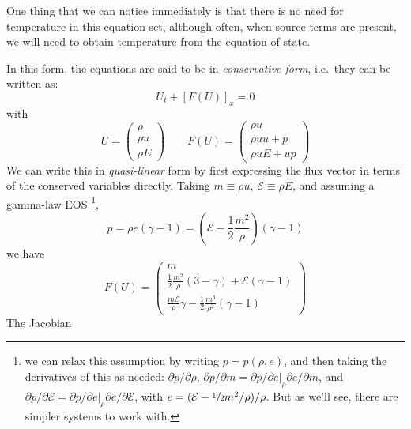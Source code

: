 One thing that we can notice immediately is that there is no need for
temperature in this equation set, although often, when source terms
are present, we will need to obtain temperature from the equation of
state.

In this form, the equations are said to be in {\em conservative form},
i.e.\ they can be written as:
\begin{equation}
U_t + \left [F(U) \right ]_x = 0
\end{equation}
with
\begin{equation}
U = \left ( \begin{array}{c} \rho \\ \rho u \\ \rho E \end{array} \right )
%
\qquad
%
F(U) = \left ( \begin{array}{c} \rho u \\ \rho uu + p \\ \rho u E + up \end{array} \right )
\end{equation}
%
We can write this in {\em quasi-linear} form by first expressing the
flux vector in terms of the conserved variables directly.  Taking $m
\equiv \rho u$, $\mathcal{E} \equiv \rho E$, and assuming a gamma-law
EOS%
\footnote{we can relax this assumption by writing $p = p(\rho, e)$, and then
taking the derivatives of this as needed:  $\partial p/\partial \rho$, 
$\partial p/\partial m = \partial p /\partial e|_\rho \partial e/\partial m$,
and $\partial p/\partial \mathcal{E} = \partial p/\partial e|_\rho \partial e/\partial \mathcal{E}$,
with $e = (\mathcal{E} - {\sfrac{1}{2}} m^2/\rho)/\rho$.  But as we'll see, there are
simpler systems to work with.},
\begin{equation}
p = \rho e (\gamma-1) =  \left (\mathcal{E} - \frac{1}{2} \frac{m^2}{\rho}\right )(\gamma - 1)
\end{equation}
we have
\begin{equation}
F(U) = \left ( \begin{array}{c}
      m \\
      \frac{1}{2}\frac{m^2}{\rho} \left (3 - \gamma \right ) +
          \mathcal{E} (\gamma - 1) \\
      \frac{m\mathcal{E}}{\rho} \gamma -\frac{1}{2} \frac{m^3}{\rho^2} (\gamma -1) \end{array} \right )
\end{equation}
The Jacobian%
